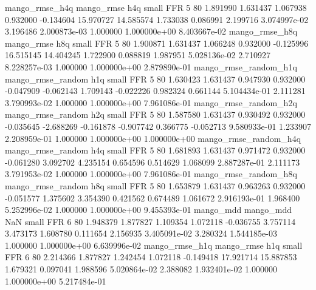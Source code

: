        mango_rmse_h4q        mango_rmse                  h4q      small      FFR                 5 80 1.891990       1.631437 1.067938       0.932000   -0.134604     15.970727     14.585574     1.733038       0.086991  2.199716 3.074997e-02     3.196486   2.000873e-03            1.000000    1.000000e+00        8.403667e-02
       mango_rmse_h8q        mango_rmse                  h8q      small      FFR                 5 80 1.900871       1.631437 1.066248       0.932000   -0.125996     16.515145     14.404245     1.722900       0.088819  1.987951 5.028136e-02     2.710927   8.228257e-03            1.000000    1.000000e+00        2.879890e-01
mango_rmse_random_h1q mango_rmse_random                  h1q      small      FFR                 5 80 1.630423       1.631437 0.947930       0.932000   -0.047909     -0.062143      1.709143    -0.022226       0.982324  0.661144 5.104434e-01     2.111281   3.790993e-02            1.000000    1.000000e+00        7.961086e-01
mango_rmse_random_h2q mango_rmse_random                  h2q      small      FFR                 5 80 1.587580       1.631437 0.930492       0.932000   -0.035645     -2.688269     -0.161878    -0.907742       0.366775 -0.052713 9.580933e-01     1.233907   2.208959e-01            1.000000    1.000000e+00        1.000000e+00
mango_rmse_random_h4q mango_rmse_random                  h4q      small      FFR                 5 80 1.681893       1.631437 0.971472       0.932000   -0.061280      3.092702      4.235154     0.654596       0.514629  1.068099 2.887287e-01     2.111173   3.791953e-02            1.000000    1.000000e+00        7.961086e-01
mango_rmse_random_h8q mango_rmse_random                  h8q      small      FFR                 5 80 1.653879       1.631437 0.963263       0.932000   -0.051577      1.375602      3.354390     0.421562       0.674489  1.061672 2.916193e-01     1.968400   5.252996e-02            1.000000    1.000000e+00        9.455393e-01
            mango_mdd         mango_mdd                  NaN      small      FFR                 6 80 1.948379       1.877827 1.109354       1.072118   -0.036755      3.757114      3.473173     1.608780       0.111654  2.156935 3.405091e-02     3.280324   1.544185e-03            1.000000    1.000000e+00        6.639996e-02
       mango_rmse_h1q        mango_rmse                  h1q      small      FFR                 6 80 2.214366       1.877827 1.242454       1.072118   -0.149418     17.921714     15.887853     1.679321       0.097041  1.988596 5.020864e-02     2.388082   1.932401e-02            1.000000    1.000000e+00        5.217484e-01
